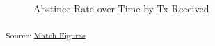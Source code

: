 \documentclass[
  letterpaper,
  DIV=11,
  numbers=noendperiod]{scrartcl}
\begin{document}
\begin{figure}[H]


\caption{\label{fig-tx_week_3}Abstince Rate over Time by Tx Received}

\end{figure}%

\textsubscript{Source:
\href{https://jjcurtin.github.io/lectures_science/notebooks/match_figs-preview.html\#cell-fig-tx_week_3}{Match
Figures}}
\end{document}
